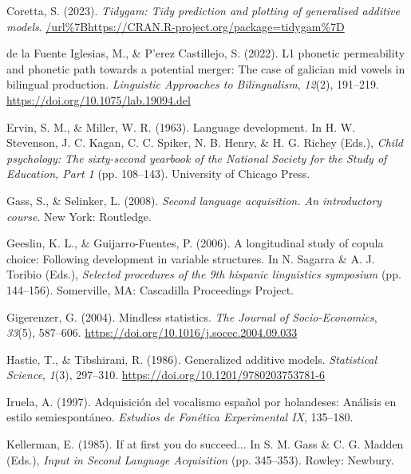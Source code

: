 \documentclass[
  letterpaper,
  DIV=11,
  numbers=noendperiod]{scrartcl}
\newlength{\cslhangindent}
\newenvironment{CSLReferences}[2] %
 {\begin{list}{}{%
  \setlength{\itemindent}{0pt}
  \setlength{\leftmargin}{0pt}
  \setlength{\parsep}{0pt}
  \ifodd #1
   \setlength{\leftmargin}{\cslhangindent}
   \setlength{\itemindent}{-1\cslhangindent}
  \fi
  \setlength{\itemsep}{#2\baselineskip}}}
 {\end{list}}
\begin{document}
\begin{CSLReferences}{1}{0}
Coretta, S. (2023). \emph{Tidygam: Tidy prediction and plotting of
generalised additive models}.
\url{/url\%7Bhttps://CRAN.R-project.org/package=tidygam\%7D}

de la Fuente Iglesias, M., \& P'erez Castillejo, S. (2022). L1 phonetic
permeability and phonetic path towards a potential merger: The case of
galician mid vowels in bilingual production. \emph{Linguistic Approaches
to Bilingualism}, \emph{12}(2), 191--219.
\url{https://doi.org/10.1075/lab.19094.del}

Ervin, S. M., \& Miller, W. R. (1963). Language development. In H. W.
Stevenson, J. C. Kagan, C. C. Spiker, N. B. Henry, \& H. G. Richey
(Eds.), \emph{Child psychology: The sixty-second yearbook of the
{National Society for the Study of Education}, {P}art 1} (pp. 108--143).
University of Chicago Press.

Gass, S., \& Selinker, L. (2008). \emph{Second language acquisition. An
introductory course}. New York: Routledge.

Geeslin, K. L., \& Guijarro-Fuentes, P. (2006). A longitudinal study of
copula choice: Following development in variable structures. In N.
Sagarra \& A. J. Toribio (Eds.), \emph{Selected procedures of the 9th
hispanic linguistics symposium} (pp. 144--156). Somerville, MA:
Cascadilla Proceedings Project.

Gigerenzer, G. (2004). Mindless statistics. \emph{The Journal of
Socio-Economics}, \emph{33}(5), 587--606.
\url{https://doi.org/10.1016/j.socec.2004.09.033}

Hastie, T., \& Tibshirani, R. (1986). Generalized additive models.
\emph{Statistical Science}, \emph{1}(3), 297--310.
\url{https://doi.org/10.1201/9780203753781-6}

Iruela, A. (1997). Adquisici{ó}n del vocalismo espa{ñ}ol por holandeses:
An{á}lisis en estilo semiespont{á}neo. \emph{Estudios de Fon{é}tica
Experimental IX}, 135--180.

Kellerman, E. (1985). If at first you do succeed... In S. M. Gass \& C.
G. Madden (Eds.), \emph{Input in {Second Language Acquisition}} (pp.
345--353). Rowley: Newbury.


\end{CSLReferences}
\end{document}
